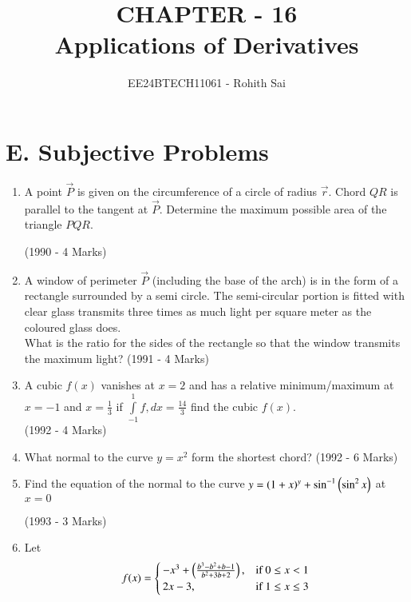 \documentclass[journal]{IEEEtran}
\begin{document}

\vspace{3cm}

\title{CHAPTER - 16\\Applications of Derivatives}
\author{EE24BTECH11061 - Rohith Sai}
\maketitle

\renewcommand{\thefigure}{\theenumi}
\renewcommand{\thetable}{\theenumi}

\section{E. Subjective Problems}

\begin{enumerate}

\item A point $\vec{P}$ is given on the circumference of a circle of radius $\vec{r}$. Chord $QR$ is parallel to the tangent at $\vec{P}$. Determine the maximum possible area of the triangle $PQR$.

\hfill (1990 - 4 Marks)


\item A window of perimeter $\vec{P}$ (including the base of the arch) is in the form of a rectangle surrounded by a semi circle. The semi-circular portion is fitted with clear glass transmits three times as much light per square meter as the coloured glass does.\\What is the ratio for the sides of the rectangle so that the window transmits the maximum light?
\hfill (1991 - 4 Marks)

\item A cubic $f(x)$ vanishes at $x=2$ and has a relative minimum/maximum at $x=-1$ and $x=\frac{1}{3}$ if
$\int\limits_{-1}^1 f ,dx = \frac{14}{3}$
find the cubic $f(x)$.\\
\hfill (1992 - 4 Marks)

\item What normal to the curve $y=x^2$ form the shortest chord?
\hfill (1992 - 6 Marks)

\item Find the equation of the normal to the curve $y=(1+x)^y + \sin^{-1}\left(\sin^2x\right)$ at $x=0$

\hfill (1993 - 3 Marks)


\item Let 
\begin{align*}
f(x) = \begin{cases}
-x^3 + \left(\frac{b^3-b^2+b-1}{b^2+3b+2}\right), & \text{if } 0\leq x < 1\\
2x-3, & \text{if } 1\leq x \leq 3
\end{cases}
\end{align*}


\end{enumerate}
\end{document}
